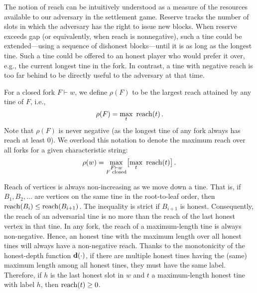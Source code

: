 The notion of reach can be intuitively understood as a measure of
the resources available to our adversary in the settlement
game. Reserve tracks the number of slots in which the adversary has
the right to issue new blocks.  When reserve exceeds gap (or
equivalently, when reach is nonnegative), such a tine could be
extended---using a sequence of dishonest blocks---until it is as long
as the longest tine. Such a tine could be offered to an honest player
who would prefer it over, e.g., the current longest tine in the
fork. In contrast, a tine with negative reach is too far behind to be
directly useful to the adversary at that time.

\begin{definition}
For a closed fork $F\vdash w$, we define $\rho(F)$ to be the largest reach attained by any tine of $F$, i.e., 
\[
\rho(F)=\underset{t}\max \ \reach(t)\,.
\]
Note that $\rho(F)$ is never negative (as the longest tine of any fork always has reach at least 0). We overload this notation to denote the maximum reach over all forks for a given characteristic string: 
\[
\rho(w)=\underset{\substack{F\vdash w\\\text{$F$ closed}}}\max\big[\underset{t}\max \ \operatorname{reach}(t)\big]\,.
\]
\end{definition}

Reach of vertices is always non-increasing as we move down a tine. 
That is, if $B_1, B_2, \ldots$ are vertices on the same tine in the root-to-leaf order, then 
$\operatorname{reach}(B_i) \leq \operatorname{reach}(B_{i+1})$. 
The inequality is strict if $B_{i + 1}$ is honest. 
Consequently, the reach of an adversarial tine is no more than 
the reach of the last honest vertex in that tine. 
In any fork, the reach of a maximum-length tine is always non-negative. 
Hence, an honest tine with the maximum length over all honest tines 
will always have a non-negative reach. 
Thanks to the monotonicity of the honest-depth function $\mathbf{d}(\cdot)$, 
if there are multiple honest tines 
having the (same) maximum length among all honest tines, 
they must have the same label. 
Therefore, if $h$ is the last honest slot in $w$ and 
$t$ a maximum-length honest tine with label $h$,  
then $\operatorname{reach}(t) \geq 0$. 


